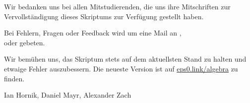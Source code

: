 
Wir bedanken uns bei allen Mitstudierenden, die uns ihre Mitschriften zur Vervollständigung dieses Skriptums zur Verfügung gestellt haben.

Bei Fehlern, Fragen oder Feedback wird um eine Mail an , \\  oder  gebeten.

Wir bemühen uns, das Skriptum stets auf dem aktuellsten Stand zu halten und etwaige Fehler auszubessern. Die neueste Version ist auf \href{https://eps0.link/algebra}{\ttfamily eps0.link/algebra} zu finden.

\begin{flushright}
    Ian Hornik, Daniel Mayr, Alexander Zach
\end{flushright}
